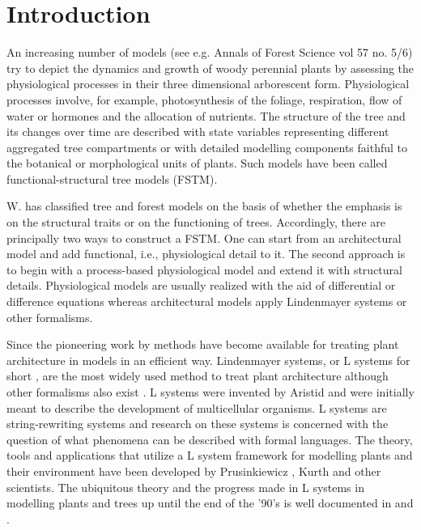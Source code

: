 \section{Introduction} 

An increasing number of models  (see e.g. Annals of Forest Science vol
57 no.  5/6) try to depict  the dynamics and growth of woody perennial
plants  by  assessing  the  physiological  processes  in  their  three
dimensional  arborescent form.   Physiological processes  involve, for
example, photosynthesis of the  foliage, respiration, flow of water or
hormones and the  allocation of nutrients.  The structure  of the tree
and  its  changes  over   time  are  described  with  state  variables
representing different  aggregated tree compartments  or with detailed
modelling components faithful to  the botanical or morphological units
of plants.   Such models  have been called  functional-structural tree
models (FSTM).

W.  \citet{kurth:94b}  has  classified tree and  forest  models on the
basis of whether  the emphasis is on  the structural traits or  on the
functioning of trees.  Accordingly, there  are principally two ways to
construct  a  FSTM.     One can start   from   an  architectural model
\citep{jaeger:92,  kurth:94} and  add  functional, i.e., physiological
detail to it.  The second  approach is to  begin with a  process-based
physiological model \citep{makela:86, landsberg:86, sievanen:93}   and
extend it with   structural details. Physiological models  are usually
realized with  the  aid of    differential  or difference    equations
\citep{landsberg:86} whereas  architectural  models  apply Lindenmayer
systems \citep{kurth:99,pp:90} or other formalisms.

Since  the pioneering  work  by \citet{honda:71}  methods have  become
available for  treating plant architecture  in models in  an efficient
way.  Lindenmayer  systems, or L systems for  short \citep{pp:89}, are
the most widely used method to treat plant architecture although other
formalisms   also  exist  \citep[e.g.][]{dereffye:97,   godin:99}.   L
systems    were    invented    by    Aristid    \citet{lindenmayer:68,
  lindenmayer:71} and were initially meant to describe the development
of  multicellular organisms.  L  systems are  string-rewriting systems
and research on  these systems is concerned with  the question of what
phenomena can  be described with formal languages.   The theory, tools
and  applications that  utilize  a L  system  framework for  modelling
plants  and their  environment  have been  developed by  Prusinkiewicz
\citep{pp:89,pp:92}, Kurth \citep{kurth:94} and other scientists.  The
ubiquitous  theory and  the progress  made in  L systems  in modelling
plants and trees  up until the end of the '90's  is well documented in
\citet{pp:90,pp:99} and \citet{kurth:99}.

